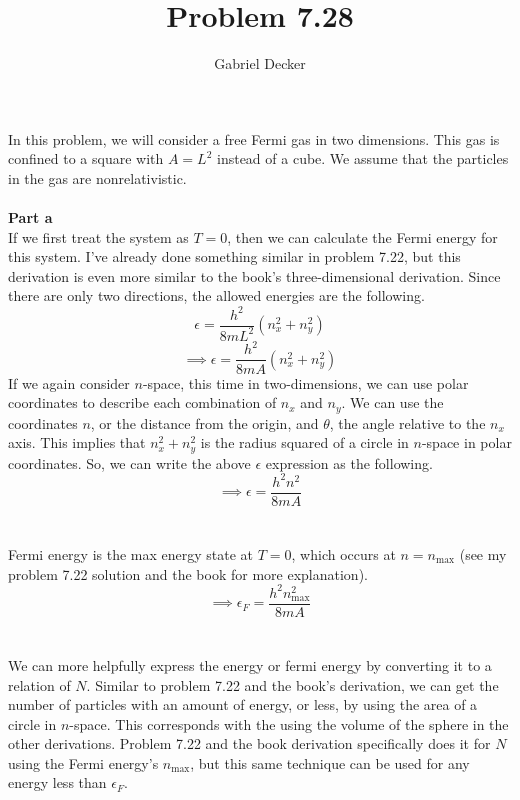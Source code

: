 \documentclass[12pt]{article}
\title{Problem 7.28}
\author{Gabriel Decker}
\begin{document}
\maketitle
\begin{flushleft}


In this problem, we will consider a free Fermi gas in two dimensions.
This gas is confined to a square with $A=L^2$ instead of a cube.
We assume that the particles in the gas are nonrelativistic.\\~\\


\textbf{Part a}\\
If we first treat the system as $T=0$, then we can calculate the Fermi energy for this system.
I've already done something similar in problem 7.22, but this derivation is even more similar to the book's three-dimensional derivation.
Since there are only two directions, the allowed energies are the following.
$$\epsilon=\frac{h^2}{8mL^2}(n_x^2+n_y^2)$$
$$\implies\epsilon=\frac{h^2}{8mA}(n_x^2+n_y^2)$$
If we again consider $n$-space, this time in two-dimensions, we can use polar coordinates to describe each combination of $n_x$ and $n_y$.
We can use the coordinates $n$, or the distance from the origin, and $\theta$, the angle relative to the $n_x$ axis.
This implies that $n_x^2+n_y^2$ is the radius squared of a circle in $n$-space in polar coordinates.
So, we can write the above $\epsilon$ expression as the following.
$$\implies\epsilon=\frac{h^2n^2}{8mA}$$\\~\\

Fermi energy is the max energy state at $T=0$, which occurs at $n=n_\text{max}$ (see my problem 7.22 solution and the book for more explanation).
$$\implies\epsilon_F=\frac{h^2n_\text{max}^2}{8mA}$$\\~\\

We can more helpfully express the energy or fermi energy by converting it to a relation of $N$.
Similar to problem 7.22 and the book's derivation, we can get the number of particles with an amount of energy, or less, by using the area of a circle in $n$-space.
This corresponds with the using the volume of the sphere in the other derivations.
Problem 7.22 and the book derivation specifically does it for $N$ using the Fermi energy's $n_\text{max}$, but this same technique can be used for any energy less than $\epsilon_F$.\\~\\


\end{flushleft}
\end{document}
